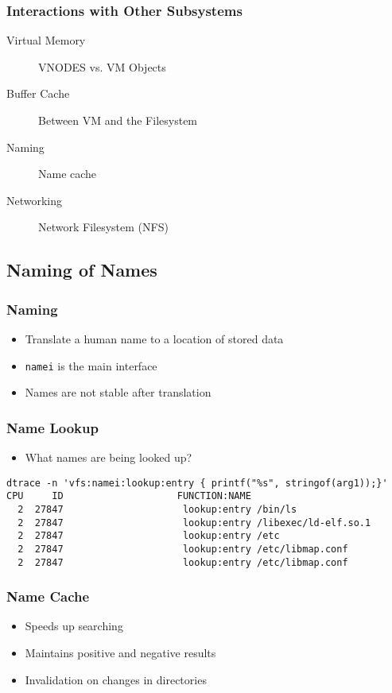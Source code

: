 \documentclass[pdftex]{beamer} %
\begin{document}
\begin{frame}
  \frametitle{Interactions with Other Subsystems}
  \begin{description}
  \item[Virtual Memory] VNODES vs. VM Objects
  \item[Buffer Cache] Between VM and the Filesystem
  \item[Naming] Name cache
  \item[Networking] Network Filesystem (NFS)
  \end{description}
\end{frame}

\subsection{Naming of Names}
\label{sec:naming}

\begin{frame}[fragile]
  \frametitle{Naming}
  \begin{itemize}
  \item Translate a human name to a location of stored data
  \item \verb+namei+ is the main interface
  \item Names are not stable after translation
  \end{itemize}
\end{frame}

\begin{frame}[fragile]
  \frametitle{Name Lookup}
  \begin{itemize}
  \item What names are being looked up?
  \end{itemize}
\begin{lstlisting}
dtrace -n 'vfs:namei:lookup:entry { printf("%s", stringof(arg1));}'
CPU     ID                    FUNCTION:NAME
  2  27847                     lookup:entry /bin/ls
  2  27847                     lookup:entry /libexec/ld-elf.so.1
  2  27847                     lookup:entry /etc
  2  27847                     lookup:entry /etc/libmap.conf
  2  27847                     lookup:entry /etc/libmap.conf
\end{lstlisting}
\end{frame}

\begin{frame}
  \frametitle{Name Cache}
  \begin{itemize}
  \item Speeds up searching
  \item Maintains positive and negative results
  \item Invalidation on changes in directories
  \end{itemize}
\end{frame}
\end{document}

